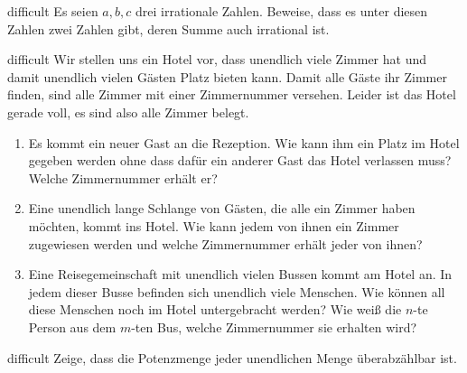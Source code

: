 \documentclass[../mengen.tex]{subfiles}
\begin{document}
\begin{exercise}{difficult}
    Es seien $a,b,c$ drei irrationale Zahlen. Beweise, dass es unter diesen Zahlen zwei Zahlen gibt, deren Summe auch irrational ist.
\end{exercise}

\begin{exercise}{difficult}
    Wir stellen uns ein Hotel vor, dass unendlich viele Zimmer hat und damit unendlich vielen Gästen Platz bieten kann. Damit alle Gäste ihr Zimmer finden, sind alle Zimmer mit einer Zimmernummer versehen. Leider ist das Hotel gerade voll, es sind also alle Zimmer belegt.
    \begin{enumerate}
        \item Es kommt ein neuer Gast an die Rezeption. Wie kann ihm ein Platz im Hotel gegeben werden ohne dass dafür ein anderer Gast das Hotel verlassen muss? Welche Zimmernummer erhält er?
        \item Eine unendlich lange Schlange von Gästen, die alle ein Zimmer haben möchten, kommt ins Hotel. Wie kann jedem von ihnen ein Zimmer zugewiesen werden und welche Zimmernummer erhält jeder von ihnen?
        \item Eine Reisegemeinschaft mit unendlich vielen Bussen kommt am Hotel an. In jedem dieser Busse befinden sich unendlich viele Menschen. Wie können all diese Menschen noch im Hotel untergebracht werden? Wie weiß die $n$-te Person aus dem $m$-ten Bus, welche Zimmernummer sie erhalten wird?
    \end{enumerate}
\end{exercise}

\begin{exercise}{difficult}
    Zeige, dass die Potenzmenge jeder unendlichen Menge überabzählbar ist.
\end{exercise}
\end{document}
